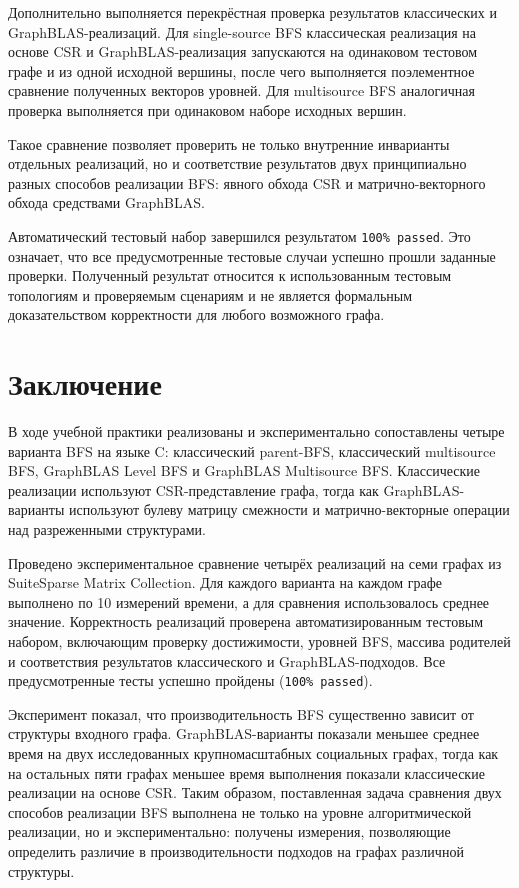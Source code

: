 \documentclass[a4paper,10pt]{article}
\begin{document}
Дополнительно выполняется перекрёстная проверка результатов
классических и GraphBLAS-реализаций. Для single-source BFS
классическая реализация на основе CSR и GraphBLAS-реализация
запускаются на одинаковом тестовом графе и из одной исходной
вершины, после чего выполняется поэлементное сравнение полученных
векторов уровней. Для multisource BFS аналогичная проверка
выполняется при одинаковом наборе исходных вершин.

Такое сравнение позволяет проверить не только внутренние инварианты
отдельных реализаций, но и соответствие результатов двух
принципиально разных способов реализации BFS: явного обхода CSR и
матрично-векторного обхода средствами GraphBLAS.

Автоматический тестовый набор завершился результатом
\texttt{100\% passed}. Это означает, что все предусмотренные
тестовые случаи успешно прошли заданные проверки. Полученный
результат относится к использованным тестовым топологиям и
проверяемым сценариям и не является формальным доказательством
корректности для любого возможного графа.

\section{Заключение}

В ходе учебной практики реализованы и экспериментально сопоставлены
четыре варианта BFS на языке C: классический parent-BFS, классический
multisource BFS, GraphBLAS Level BFS и GraphBLAS Multisource BFS.
Классические реализации используют CSR-представление графа, тогда как
GraphBLAS-варианты используют булеву матрицу смежности и
матрично-векторные операции над разреженными структурами.

Проведено экспериментальное сравнение четырёх реализаций на семи
графах из SuiteSparse Matrix Collection. Для каждого варианта на каждом
графе выполнено по 10 измерений времени, а для сравнения использовалось
среднее значение. Корректность реализаций проверена автоматизированным
тестовым набором, включающим проверку достижимости, уровней BFS,
массива родителей и соответствия результатов классического и
GraphBLAS-подходов. Все предусмотренные тесты успешно пройдены
(\texttt{100\% passed}).

Эксперимент показал, что производительность BFS существенно зависит
от структуры входного графа. GraphBLAS-варианты показали меньшее
среднее время на двух исследованных крупномасштабных социальных
графах, тогда как на остальных пяти графах меньшее время выполнения
показали классические реализации на основе CSR. Таким образом,
поставленная задача сравнения двух способов реализации BFS выполнена
не только на уровне алгоритмической реализации, но и
экспериментально: получены измерения, позволяющие определить различие
в производительности подходов на графах различной структуры.
\end{document}
